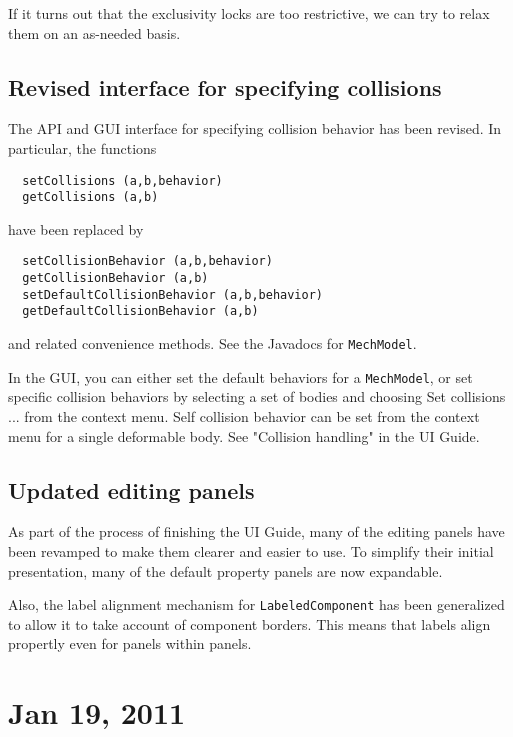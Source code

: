 \documentclass{article}
\begin{document}
If it turns out that the exclusivity locks are too restrictive, we can
try to relax them on an as-needed basis.

\subsection*{Revised interface for specifying collisions}

The API and GUI interface for specifying collision behavior has been
revised. In particular, the functions 

\begin{lstlisting}
  setCollisions (a,b,behavior)
  getCollisions (a,b)
\end{lstlisting}

have been replaced by

\begin{lstlisting}
  setCollisionBehavior (a,b,behavior)
  getCollisionBehavior (a,b)
  setDefaultCollisionBehavior (a,b,behavior)
  getDefaultCollisionBehavior (a,b)
\end{lstlisting}

and related convenience methods. See the Javadocs for {\tt MechModel}.

In the GUI, you can either set the default behaviors for a {\tt MechModel},
or set specific collision behaviors by selecting a set of
bodies and choosing {\sf Set collisions ...} from the context menu.
Self collision behavior can be set from the context menu for a single
deformable body. See "Collision handling" in the UI Guide.

\subsection*{Updated editing panels}

As part of the process of finishing the UI Guide, many of the editing
panels have been revamped to make them clearer and easier to use. To
simplify their initial presentation, many of the default property
panels are now expandable.

Also, the label alignment mechanism for {\tt LabeledComponent} has been
generalized to allow it to take account of component borders. This
means that labels align propertly even for panels within panels.

\section*{Jan 19, 2011}
\end{document}
